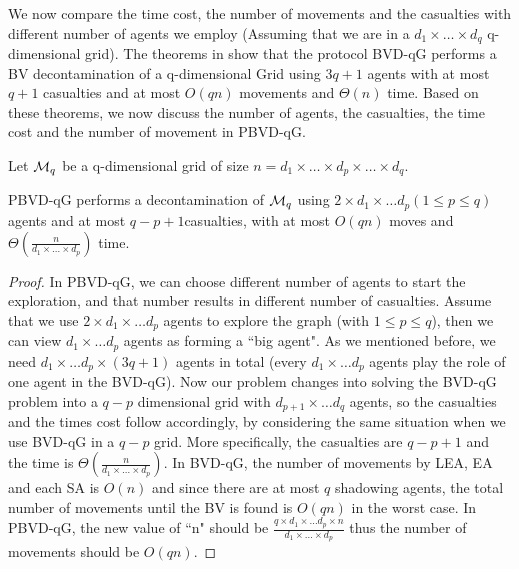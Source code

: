We now compare the time cost, the number of movements and the casualties with different number of agents we employ (Assuming that we are in a $d_1\times \ldots \times d_q$ q-dimensional grid).
The theorems in \cite{cai} show   that the protocol BVD-qG performs a BV decontamination of a q-dimensional Grid using $3q+1$ agents with at most $q+1$ casualties and  at most $O(qn)$ movements and $\Theta(n)$ time. Based on these theorems, we now discuss the number of agents, the casualties, the time cost and the number of movement in PBVD-qG.

 Let ${\cal M}_q$ be a   q-dimensional grid of size   $n=d_1  \times  \ldots \times  d_p \times  \ldots   \times  d_q $.
 \color{black}
 
\begin{theorem}
PBVD-qG performs a decontamination of  ${\cal M}_q$ using $2\times d_1\times \ldots d_p (1\leq p\leq q)$ 
agents and at most $q-p+1$casualties, with at most $O(qn)$ moves  and $\Theta(\frac{n}{d_1\times\ldots\times d_p})$ time.
\end{theorem}

\begin{proof}
In PBVD-qG, we can choose different number of agents to start the exploration, and that number results in different number of casualties. 
Assume that we use $2\times d_1\times \ldots d_p$ agents to explore the graph   (with $1\leq p\leq q$), then   we can view $d_1\times \ldots d_p$ agents as forming a ``big agent".  As we mentioned before,   we need $d_1\times \ldots d_p\times (3q+1)$ agents in total (every $d_1\times\ldots d_p$ agents play the role of one agent in the BVD-qG). Now our problem changes into solving the BVD-qG problem into a $q-p$ dimensional grid with $d_{p+1}\times \ldots d_q$ agents, so the casualties and the times cost follow accordingly, by considering the same  situation when we use BVD-qG in a $q-p$ grid. 
 More specifically, the casualties are $q-p+1$ and the time is $\Theta(\frac{n}{d_1\times\ldots\times d_p})$. 
 In BVD-qG, the number of movements by LEA, EA and each SA is $O(n)$ and since there are at most $q$ shadowing agents, the total number of movements until the BV is found is $O(qn)$ in the worst case. In PBVD-qG, the new value of ``n" should be $\frac{q\times d_1\times\ldots d_p\times n}{d_1\times\ldots\times d_p}$ thus  the number of movements should be $O(qn)$.  
\end{proof}

